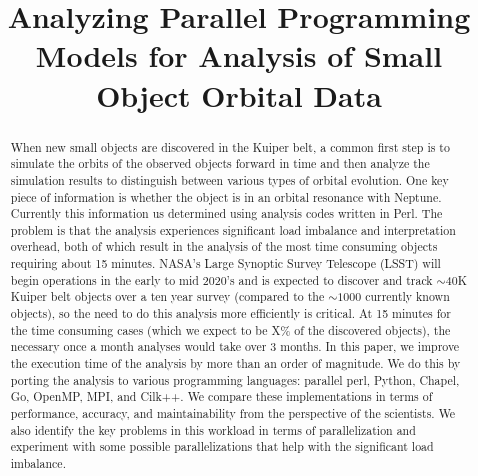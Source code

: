 \documentclass[conference]{IEEEtran}
\begin{document}
\title{Analyzing Parallel Programming Models for Analysis of Small Object Orbital Data}


\author{
\and
{}
}

\maketitle

\begin{abstract}
When new small objects are discovered in the Kuiper belt, a common first step is to simulate the orbits
of the observed objects forward in time and then analyze the simulation results to distinguish between 
various types of orbital evolution.  One key piece of information is whether the object is in an orbital resonance
with Neptune.  Currently this information us determined using analysis codes written
in Perl.  The problem is that the analysis experiences significant load imbalance and interpretation
overhead, both of which result in the analysis of the most time consuming objects requiring
about 15 minutes.  NASA's Large Synoptic Survey Telescope (LSST) will begin operations in the early to mid
2020's and is expected to discover and track $\sim$40K Kuiper belt objects over a ten year survey (compared to 
the $\sim1000$ currently known objects), so the need to do this analysis more efficiently is critical.
At 15 minutes for the time consuming cases (which we expect to be X\% of the discovered objects), the necessary 
once a month analyses would take over 3 months.
In this paper, we improve the execution time of the analysis by more than an order of 
magnitude.  We do this by porting the analysis to various programming languages:
parallel perl, Python, Chapel, Go, OpenMP, MPI, and Cilk++.
We compare these implementations in terms of performance, accuracy,
and maintainability from the perspective of the scientists.  We also
identify the key problems in this workload in terms of parallelization and
experiment with some possible parallelizations that help with the 
significant load imbalance.
\end{abstract}
\end{document}
